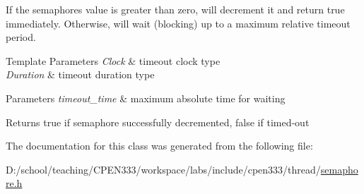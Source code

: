 If the semaphore\textquotesingle{}s value is greater than zero, will decrement it and return true immediately. Otherwise, will wait (blocking) up to a maximum relative timeout period.


\begin{DoxyTemplParams}{Template Parameters}
{\em Clock} & timeout clock type \\
\hline
{\em Duration} & timeout duration type \\
\hline
\end{DoxyTemplParams}

\begin{DoxyParams}{Parameters}
{\em timeout\+\_\+time} & maximum absolute time for waiting \\
\hline
\end{DoxyParams}
\begin{DoxyReturn}{Returns}
true if semaphore successfully decremented, false if timed-\/out 
\end{DoxyReturn}


The documentation for this class was generated from the following file\+:\begin{DoxyCompactItemize}
\item 
D\+:/school/teaching/\+C\+P\+E\+N333/workspace/labs/include/cpen333/thread/\hyperlink{thread_2semaphore_8h}{semaphore.\+h}\end{DoxyCompactItemize}
